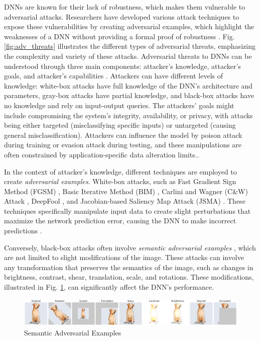 DNNs are known for their lack of robustness, which makes them vulnerable to adversarial attacks. Researchers have developed various attack techniques to expose these vulnerabilities by creating adversarial examples, which highlight the weaknesses of a DNN without providing a formal proof of robustness \cite{HuangX}. Fig. \ref{fig:adv_threats}  illustrates the different types of adversarial threats, emphasizing the complexity and variety of these attacks. Adversarial threats to DNNs can be understood through three main components: attacker's knowledge, attacker's goals, and attacker's capabilities \cite{Biggio}. Attackers can have different levels of knowledge: white-box attacks have full knowledge of the DNN's architecture and parameters, gray-box attacks have partial knowledge, and black-box attacks have no knowledge and rely on input-output queries. The attackers' goals might include compromising the system's integrity, availability, or privacy, with attacks being either targeted (misclassifying specific inputs) or untargeted (causing general misclassification). Attackers can influence the model by poison attack during training or evasion attack during testing, and these manipulations are often constrained by application-specific data alteration limits.\cite{Chakraborty}.



In the context of attacker's knowledge, different techniques are employed to create \emph{adversarial examples}. White-box attacks, such as Fast Gradient Sign Method (FGSM) \cite{FGSM}, Basic Iterative Method (BIM) \cite{BIM}, Carlini and Wagner (C\&W) Attack \cite{Carlini}, DeepFool \cite{deepfool}, and Jacobian-based Saliency Map Attack (JSMA) \cite{JSMA}. These techniques specifically manipulate input data to create slight perturbations that maximize the network prediction error, causing the DNN to make incorrect predictions \cite{Hosseini}.

Conversely, black-box attacks often involve \emph{semantic adversarial examples} \cite{HuangX,deeptest,Engstrom,Pei}, which are not limited to slight modifications of the image. These attacks can involve any transformation that preserves the semantics of the image, such as changes in brightness, contrast, shear, translation, scale, and rotations. These modifications, illustrated in Fig. \ref{fig:image-trans}, can significantly affect the DNN's performance. 

\begin{figure}
  \centering
  \includegraphics[width=\linewidth]{figures/output_update.png}
  \caption{Semantic Adversarial Examples}
  \label{fig:image-trans}
\end{figure}


